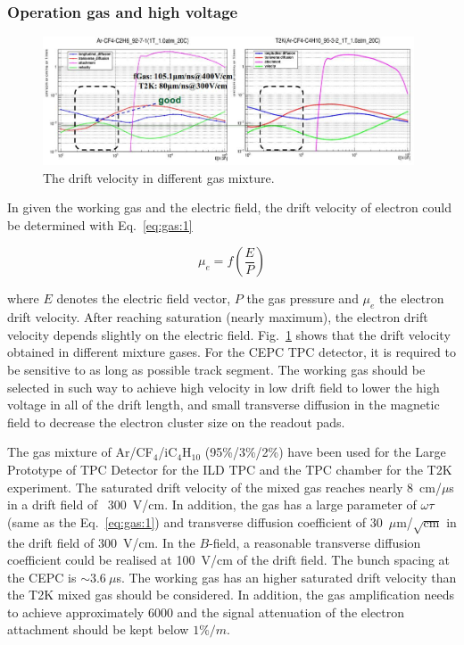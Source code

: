 \subsubsection{Operation gas and high voltage}
\begin{figure}[htbp]
\centering
\includegraphics[width=0.98\textwidth]{figures/TrackingSystem/TPC_gas_vol.jpg}
\caption{\label{fig:gas_vol} The drift velocity in different gas mixture.}
\end{figure}


In given the working gas and the electric field, the drift velocity of electron could be determined with Eq.~\ref{eq:gas:1}

\begin{equation}
\label{eq:gas:1}
\mu_e=f(\frac{E}{P})
\end{equation}

\noindent where $E$ denotes the electric field vector, $P$ the gas pressure and $\mu_e$ the electron drift velocity. After reaching saturation (nearly maximum), the electron drift velocity depends slightly on the electric field. Fig.~\ref{fig:gas_vol} shows that the drift velocity obtained in different mixture gases. For the CEPC TPC detector, it is required to be sensitive to as long as possible track segment. The working gas should be selected in such way to achieve high velocity in low drift field to lower the high voltage in all of the drift length, and small transverse diffusion in the magnetic field to decrease the electron cluster size on the readout pads.


The gas mixture of Ar/CF$_4$/iC$_4$H$_{10}$ (95\%/3\%/2\%) have been used for the Large Prototype of TPC Detector for the ILD TPC and the TPC chamber for the T2K experiment. The saturated drift velocity of the mixed gas reaches nearly 8~cm/$\mu$s in a drift field of ~300~V/cm.  In addition, the gas has a large parameter of $\omega\tau$ (same as the Eq.~\ref{eq:gas:1})  and transverse diffusion coefficient of 30~$\mu$m/$\sqrt{\mathrm{cm}}$ in the drift field of 300~V/cm. In the $B$-field, a reasonable transverse diffusion coefficient could be realised at 100~V/cm of the drift field. The bunch spacing at the CEPC is $\sim 3.6~\mu$s. The working gas has an higher saturated drift velocity than the T2K mixed gas should be considered. In addition, the gas amplification needs to achieve approximately 6000 and the signal attenuation of the electron attachment should be kept below $1\%/m$.
